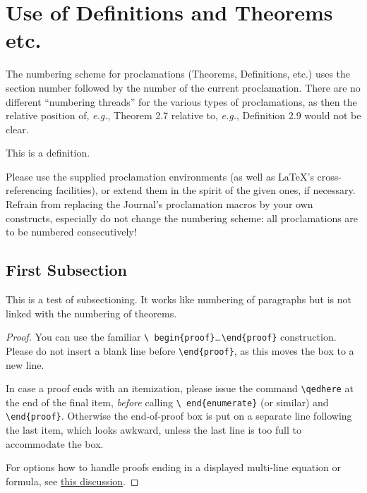 \documentclass{jpc} %
\theoremstyle{plain}\newtheorem{satz}[thm]{Satz} %
\def\eg{{\em e.g.}}
\begin{document}
\section{Use of  Definitions and Theorems etc.}

  The numbering scheme for proclamations (Theorems, Definitions, etc.)
  uses the section number followed by the number of the current
  proclamation.  There are no different ``numbering threads'' for the
  various types of proclamations, as then the relative position of,
  \eg, Theorem 2.7 relative to, \eg, Definition 2.9 would not be clear.

\begin{defi}\label{D:first}
  This is a definition.
\end{defi}

  Please use the supplied proclamation environments (as well as
  LaTeX's cross-referencing facilities), or extend them in the spirit
  of the given ones, if necessary.
  Refrain from replacing the Journal's proclamation macros by your own
  constructs, especially do not change the numbering scheme: all
  proclamations are to be numbered consecutively!

\subsection{First Subsection}

  This is a test of subsectioning.  It works like numbering of
  paragraphs but is not linked with the numbering of theorems.


\begin{proof} You can use the familiar \texttt{\textbackslash
    begin\{proof\}}\dots\texttt{\textbackslash end\{proof\}}
  construction.  Please do not insert a blank line before
  \texttt{\textbackslash end\{proof\}}, as this moves the box to a new
  line.  

  In case a proof ends with an itemization,
  please issue the command \texttt{\textbackslash qedhere} at the end
  of the final item, \emph{before} calling \texttt{\textbackslash
    end\{enumerate\}} (or similar) and \texttt{\textbackslash end\{proof\}}.
  Otherwise the end-of-proof box is put on a separate line
  following the last item, which looks awkward, unless the last line
  is too full to accommodate the box.

  For options how to handle proofs ending in a displayed multi-line
  equation or formula, see
  \href{http://tex.stackexchange.com/questions/101929/qed-or-qedhere-at-the-end-of-split-environment}{this
    discussion}.
\end{proof}
\end{document}

